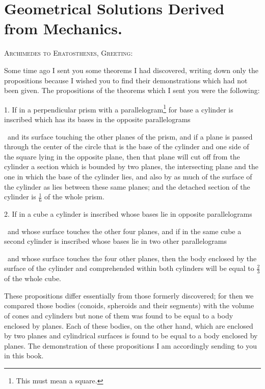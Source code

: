 \documentclass[12pt]{article}
\begin{document}
\vfill\pagebreak


\section*{Geometrical Solutions Derived from Mechanics.}

\textsc{Archimedes to Eratosthenes, Greeting:}

Some time ago I sent you some theorems I had discovered, writing down
only the propositions because I wished you to find their
demonstrations which had not been given. The propositions of the
theorems which I sent you were the following:

1. If in a perpendicular prism with a parallelogram\footnote{This must
mean a square.} for base a cylinder is inscribed which has its bases
in the opposite
parallelograms\addtocounter{footnote}{-1}\footnotemark\ and its
surface touching the other planes of the prism, and if a plane is
passed through the center of the circle that is the base of the
cylinder and one side of the square lying in the opposite plane, then
that plane will cut off from the cylinder a section which is bounded
by two planes, the intersecting plane and the one in which the base of
the cylinder lies, and also by as much of the surface of the cylinder
as lies between these same planes; and the detached section of the
cylinder is $\frac{1}{6}$ of the whole prism.

2. If in a cube a cylinder is inscribed whose bases lie in opposite
parallelograms\addtocounter{footnote}{-1}\footnotemark\ and whose
surface touches the other four planes, and if in the same cube a
second cylinder is inscribed whose bases lie in two other
parallelograms\addtocounter{footnote}{-1}\footnotemark\ and whose
surface touches the four other planes, then the body enclosed by the
surface of the cylinder and comprehended within both cylinders will be
equal to $\frac{2}{3}$ of the whole cube.

These propositions differ essentially from those formerly discovered;
for then we compared those bodies (conoids, spheroids and their
segments) with the volume of cones and cylinders but none of them was
found to be equal to a body enclosed by planes. Each of these bodies,
on the other hand, which are enclosed by two planes and cylindrical
surfaces is found to be equal to a body enclosed by planes. The
demonstration of these propositions I am accordingly sending to you in
this book.
\end{document}
